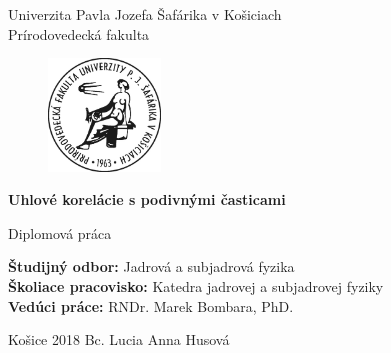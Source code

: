 \documentclass[thesismargins, thesislinespacing]{rnthesis}
\title{}
\author{Lucia Anna Husová}
\begin{document}
\begin{center}
	{\Large Univerzita Pavla Jozefa Šafárika v Košiciach} \\
	{\Large Prírodovedecká fakulta} 
\end{center}

\vspace*{2cm}

\begin{figure}[htbp!]
	\begin{center}
		\includegraphics[width=3cm]{./Obrazky_praca/logo-pf-upjs-cb.jpg}
	\end{center}
\end{figure}

\vspace*{2cm}

\begin{center}
	{\LARGE\bf Uhlové korelácie s podivnými časticami}
\end{center}

\begin{center}
	{\large Diplomová práca}
\end{center}

\vspace*{5cm}
\begin{flushleft}
{\bf Študijný odbor:}{ Jadrová a subjadrová fyzika} \\
{\bf Školiace pracovisko: }{Katedra jadrovej a subjadrovej fyziky}\\
{\bf Vedúci práce: }{ RNDr. Marek Bombara, PhD.}\\
\end{flushleft}
 
 \vspace*{2cm}
 \begin{flushleft}
{\large Košice 2018}
\hspace*{5cm}
{\large Bc. Lucia Anna Husová}
\end{flushleft}

\thispagestyle{empty}
\newpage

\maketitle
\newpage
\tableofcontents
\newpage
\end{document}
